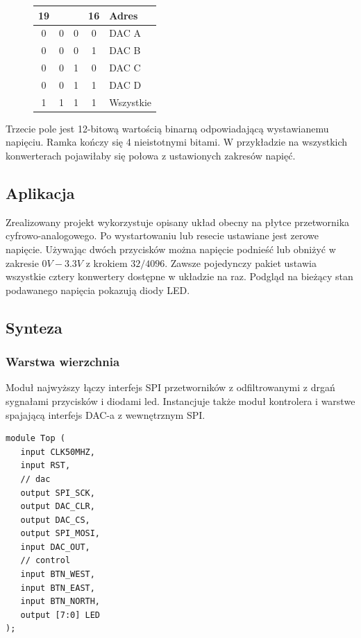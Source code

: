 \documentclass[a4paper,12pt]{article}
\begin{document}
\begin{figure}[htb]
  \centering
	\begin{tabular}{|c|c|c|c|l|}
	  \multicolumn{1}{r}{19}&\multicolumn{1}{r}{}&\multicolumn{1}{r}{}&\multicolumn{1}{r}{16}&\multicolumn{1}{l}{Adres}\\
		\hline
		0&0&0&0 & DAC A\\
		\hline
		0&0&0&1 & DAC B\\
		\hline
		0&0&1&0 & DAC C\\
		\hline
		0&0&1&1 & DAC D\\
		\hline
		1&1&1&1 & Wszystkie\\
		\hline
	\end{tabular}
\end{figure}

Trzecie pole jest 12-bitową wartością binarną odpowiadającą wystawianemu napięciu. Ramka kończy się 4 nieistotnymi bitami. W przykładzie na wszystkich konwerterach pojawiłaby się połowa z ustawionych zakresów napięć.


\subsection{Aplikacja}

Zrealizowany projekt wykorzystuje opisany układ obecny na płytce przetwornika cyfrowo-analogowego. Po wystartowaniu lub resecie ustawiane jest zerowe napięcie. Używając dwóch przycisków można napięcie podnieść lub obniżyć w zakresie $0V - 3.3V$ z krokiem $32 / 4096$. Zawsze pojedynczy pakiet ustawia wszystkie cztery konwertery dostępne w układzie na raz. Podgląd na bieżący stan podawanego napięcia pokazują diody LED.


\subsection{Synteza}

\subsubsection{Warstwa wierzchnia}

Moduł najwyższy łączy interfejs SPI przetworników z odfiltrowanymi z drgań sygnałami przycisków i diodami led. Instancjuje także moduł kontrolera i warstwe spajającą interfejs DAC-a z wewnętrznym SPI.
\begin{lstlisting}[label=Top,caption=Top.v]
module Top (
   input CLK50MHZ,
   input RST,
   // dac
   output SPI_SCK,
   output DAC_CLR,
   output DAC_CS,
   output SPI_MOSI,
   input DAC_OUT,
   // control
   input BTN_WEST,
   input BTN_EAST,
   input BTN_NORTH,
   output [7:0] LED
);
\end{lstlisting}
\end{document}
